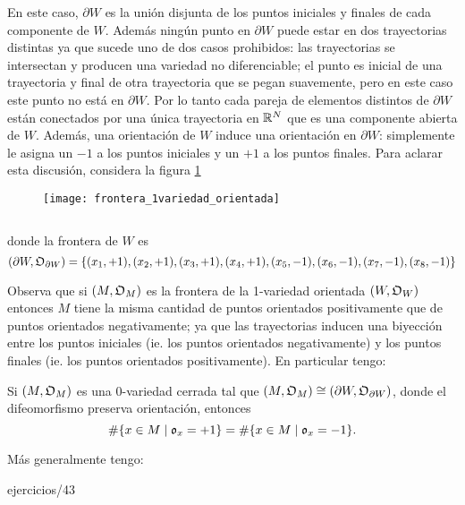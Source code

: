 \documentclass[../../topologia_algebraica]{subfiles}
\begin{document}
En este caso, $\partial W$ es la uni\'on disjunta de los puntos iniciales y finales de cada
componente de $W$. Adem\'as ning\'un punto en $\partial W$ puede estar en dos trayectorias
distintas ya que sucede uno de dos casos prohibidos: las trayectorias se intersectan y producen
una variedad no diferenciable; el punto es inicial de una trayectoria y final de otra trayectoria
que se pegan suavemente, pero en este caso este punto no est\'a en $\partial W$. Por lo tanto
cada pareja de elementos distintos de $\partial W$ est\'an conectados por una \'unica
trayectoria en $\mathbb{R}^N$ que es una componente abierta de $W$.
Adem\'as, una orientaci\'on de $W$ induce una orientaci\'on en $\partial W$: simplemente le asigna
un $-1$ a los puntos iniciales y un $+1$ a los puntos finales.
Para aclarar esta discusi\'on, considera la figura \ref{fig:frontera_1variedad_orientada} %
%
\begin{figure}[ht] %
  \centering\caption{$\;$}\label{fig:frontera_1variedad_orientada}
  \texttt{[image: frontera\_1variedad\_orientada]}
\end{figure}%
%
donde la frontera de $W$ es
\[
  (\partial W,\mathfrak{O}_{\partial W})=
  \{(x_1,+1),(x_2,+1),(x_3,+1),(x_4,+1),(x_5,-1),(x_6,-1),(x_7,-1),(x_8,-1)\}
\]

Observa que si $(M,\mathfrak{O}_M)$ es la frontera de la 1-variedad orientada $(W,\mathfrak{O}_W)$ entonces
$M$ tiene la misma cantidad de puntos orientados positivamente que de puntos orientados negativamente;
ya que las trayectorias inducen una biyecci\'on entre los puntos iniciales (ie. los puntos orientados
negativamente) y los puntos finales (ie. los puntos orientados positivamente). En particular
tengo:

\begin{prop}\label{prop:cantidad_orientaciones}
  Si $(M,\mathfrak{O}_M)$ es una 0-variedad cerrada tal que $(M,\mathfrak{O}_M)\cong(\partial W,\mathfrak{O}_{\partial W})$,
  donde el difeomorfismo preserva orientaci\'on, entonces
  \[
    \#\{x\in M\mid \mathfrak{o}_x=+1\}=\#\{x\in M\mid \mathfrak{o}_x=-1\}.
  \]
\end{prop}

M\'as generalmente tengo:

{ejercicios/43} %
\end{document}
